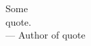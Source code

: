 \cleardoublepage
\thispagestyle{empty}


\vspace*{8cm}

\begin{raggedleft}
    	Some \\
	quote.\\
     --- Author of quote\\
\end{raggedleft}




